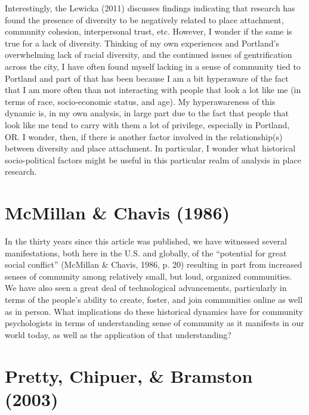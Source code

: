 \documentclass[11pt,]{tufte-handout}
\begin{document}
Interestingly, the Lewicka (2011) discusses findings indicating that
research has found the presence of diversity to be negatively related to
place attachment, community cohesion, interpersonal trust, etc. However,
I wonder if the same is true for a lack of diversity. Thinking of my own
experiences and Portland's overwhelming lack of racial diversity, and
the continued issues of gentrification across the city, I have often
found myself lacking in a sense of community tied to Portland and part
of that has been because I am a bit hyperaware of the fact that I am
more often than not interacting with people that look a lot like me (in
terms of race, socio-economic status, and age). My hyperawareness of
this dynamic is, in my own analysis, in large part due to the fact that
people that look like me tend to carry with them a lot of privilege,
especially in Portland, OR. I wonder, then, if there is another factor
involved in the relationship(s) between diversity and place attachment.
In particular, I wonder what historical socio-political factors might be
useful in this particular realm of analysis in place research.

\section{McMillan \& Chavis (1986)}\label{mcmillan1986sense}

In the thirty years since this article was published, we have witnessed
several manifestations, both here in the U.S. and globally, of the
``potential for great social conflict'' (McMillan \& Chavis, 1986, p.
20) resulting in part from increased senses of community among
relatively small, but loud, organized communities. We have also seen a
great deal of technological advancements, particularly in terms of the
people's ability to create, foster, and join communities online as well
as in person. What implications do these historical dynamics have for
community psychologists in terms of understanding sense of community as
it manifests in our world today, as well as the application of that
understanding?

\section{Pretty, Chipuer, \& Bramston (2003)}\label{pretty2003sense}
\end{document}
